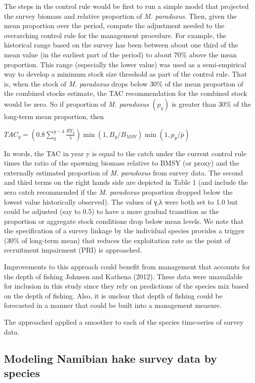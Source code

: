 \documentclass[
  letterpaper,
  DIV=11,
  numbers=noendperiod]{scrartcl}
\begin{document}
The steps in the control rule would be first to run a simple model that
projected the survey biomass and relative proportion of \emph{M.
paradoxus}. Then, given the mean proportion over the period, compute the
adjustment needed to the overarching control rule for the management
procedure. For example, the historical range based on the survey has
been between about one third of the mean value (in the earliest part of
the period) to about 70\% above the mean proportion. This range
(especially the lower value) was used as a semi-empirical way to develop
a minimum stock size threshold as part of the control rule. That is,
when the stock of \emph{M. paradoxus} drops below 30\% of the mean
proportion of the combined stocks estimate, the TAC recommendation for
the combined stock would be zero. So if proportion of \emph{M.
paradoxus} \((p_y)\) is greater than 30\% of the long-term mean
proportion, then

\(TAC_y=(0.8 \sum_{y}^{y-4}\frac{RY_y} 5) \min(1,B_y/B_{MSY})  \min(1,p_y/\bar{p})\)

In words, the TAC in year y is equal to the catch under the current
control rule times the ratio of the spawning biomass relative to BMSY
(or proxy) and the externally estimated proportion of \emph{M.
paradoxus} from survey data. The second and third terms on the right
hands side are depicted in Table 1 (and include the zero catch
recommended if the \emph{M. paradoxus} proportion dropped below the
lowest value historically observed). The values of γ,λ were both set to
1.0 but could be adjusted (say to 0.5) to have a more gradual transition
as the proportion or aggregate stock conditions drop below mean levels.
We note that the specification of a survey linkage by the individual
species provides a trigger (30\% of long-term mean) that reduces the
exploitation rate as the point of recruitment impairment (PRI) is
approached.

Improvements to this approach could benefit from management that
accounts for the depth of fishing Johnsen and Kathena (2012). These data
were unavailable for inclusion in this study since they rely on
predictions of the species mix based on the depth of fishing. Also, it
is unclear that depth of fishing could be forecasted in a manner that
could be built into a management measure.

The approached applied a smoother to each of the species time-series of
survey data.

\subsection{Modeling Namibian hake survey data by
species}\label{modeling-namibian-hake-survey-data-by-species}
\end{document}
